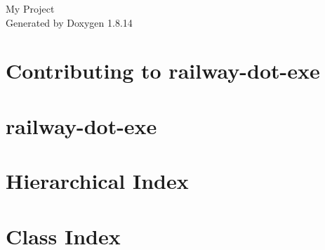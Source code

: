 \documentclass[twoside]{book}
\newcommand{\+}{\discretionary{\mbox{\scriptsize$\hookleftarrow$}}{}{}}
\newcommand{\clearemptydoublepage}{%
  \newpage{\pagestyle{empty}\cleardoublepage}%
}
\begin{document}
\hypersetup{pageanchor=false,
             bookmarksnumbered=true,
             pdfencoding=unicode
            }
\begin{titlepage}
\vspace*{7cm}
\begin{center}%
{\Large My Project }\\
\vspace*{1cm}
{\large Generated by Doxygen 1.8.14}\\
\end{center}
\end{titlepage}
\clearemptydoublepage
{}
\tableofcontents
\clearemptydoublepage
{}
\hypersetup{pageanchor=true}

\chapter{Contributing to railway-\/dot-\/exe}
\label{md__c_1__programming_work_railway_development_after_v2_82_80__c_o_n_t_r_i_b_u_t_i_n_g}

\chapter{railway-\/dot-\/exe}
\label{md__c_1__programming_work_railway_development_after_v2_82_80__r_e_a_d_m_e}

\chapter{Hierarchical Index}

\chapter{Class Index}

\end{document}
